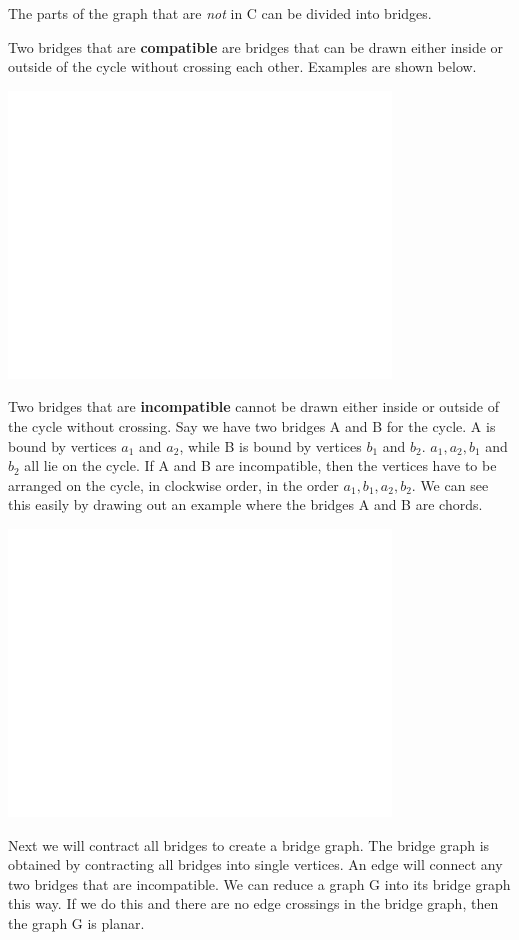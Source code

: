 The parts of the graph that are \emph{not} in C can be divided into bridges.

Two bridges that are \textbf{compatible} are bridges that can be drawn either inside or outside of the cycle without crossing each other. Examples are shown below.

\includegraphics[height = 3in]{white.png}

Two bridges that are \textbf{incompatible} cannot be drawn either inside or outside of the cycle without crossing. Say we have two bridges A and B for the cycle.  A is bound by vertices $a_1$ and $a_2$, while B is bound by vertices $b_1$ and $b_2$. $a_1, a_2, b_1$ and $b_2$ all lie on the cycle. If A and B are incompatible, then the vertices have to be arranged on the cycle, in clockwise order, in the order $a_1, b_1, a_2, b_2$.  We can see this easily by drawing out an example where the bridges A and B are chords.

\includegraphics[height = 3in]{white.png}

Next we will contract all bridges to create a bridge graph. The bridge graph is obtained by contracting all bridges into single vertices. An edge will connect any two bridges that are incompatible. We can reduce a graph G into its bridge graph this way. If we do this and there are no edge crossings in the bridge graph, then the graph G is planar.

